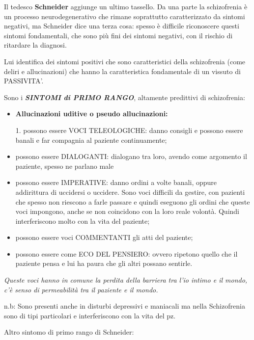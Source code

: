 Il tedesco \textbf{Schneider} aggiunge un ultimo tassello. Da una parte
la schizofrenia è un processo neurodegenerativo che rimane soprattutto
caratterizzato da sintomi negativi, ma Schneider dice una terza cosa:
spesso è difficile riconoscere questi sintomi fondamentali, che sono più
fini dei sintomi negativi, con il rischio di ritardare la diagnosi.

Lui identifica dei sintomi positivi che sono caratteristici della
schizofrenia (come deliri e allucinazioni) che hanno la caratteristica
fondamentale di un vissuto di PASSIVITA'.

Sono i \textbf{\emph{SINTOMI di PRIMO RANGO}}, altamente predittivi di
schizofrenia:

\begin{itemize}
\item
  \textbf{Allucinazioni uditive o pseudo allucinazioni: }
\end{itemize}

\begin{itemize}
\item[1.]
  possono essere VOCI TELEOLOGICHE: danno consigli e possono essere
  banali e far compagnia al paziente continuamente;
\item
  possono essere DIALOGANTI: dialogano tra loro, avendo come argomento
  il paziente, spesso ne parlano male
\item
  possono essere IMPERATIVE: danno ordini a volte banali, oppure
  addirittura di uccidersi o uccidere. Sono voci difficili da gestire,
  con pazienti che spesso non riescono a farle passare e quindi eseguono
  gli ordini che queste voci impongono, anche se non coincidono con la
  loro reale volontà. Quindi interferiscono molto con la vita del
  paziente;
\item
  possono essere voci COMMENTANTI gli atti del paziente;
\item
  possono essere come ECO DEL PENSIERO: ovvero ripetono quello che il
  paziente pensa e lui ha paura che gli altri possano sentirle.
\end{itemize}

\emph{Queste voci hanno in comune la perdita della barriera tra l'io
intimo e il mondo, c'è senso di permeabilità tra il paziente e il
mondo.}

n.b: Sono presenti anche in disturbi depressivi e maniacali ma nella
Schizofrenia sono di tipi particolari e interferiscono con la vita del
pz.

Altro sintomo di primo rango di Schneider:

